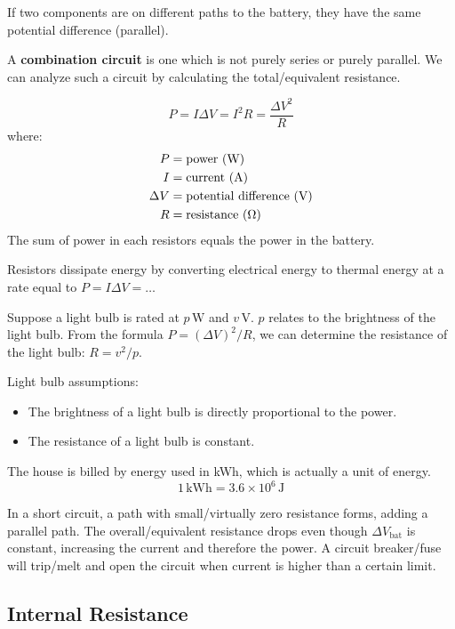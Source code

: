 \documentclass{article}
\newcommand{\definition}[1]{\begin{tcolorbox}[colback=red!5!white,colframe=red!75!black,parbox=false] #1 \end{tcolorbox}}
\newcommand{\defitheorem}[2]{\begin{tcolorbox}[title={#1},colback=violet!5!white,colframe=violet!75!black,parbox=false] #2 \end{tcolorbox}}
\newcommand{\remark}[2]{\begin{tcolorbox}[title={#1},colback=black!5!white,colframe=black!75!black,parbox=false] #2 \end{tcolorbox}}
\begin{document}
If two components are on different paths to the battery, they have the same potential difference (parallel).

\definition{A \textbf{combination circuit} is one which is not purely series or purely parallel. We can analyze such a circuit by calculating the total/equivalent resistance.}

\defitheorem{Power}{
	\begin{equation*}
	    P
		=I\Delta V
		=I^2R
		=\frac{\Delta V^2}{R}
	\end{equation*}
	where:
	\begin{align*}
		P&=\text{power (W)} \\
		I&=\text{current (A)} \\
		\Delta V&=\text{potential difference (V)} \\
		R&=\text{resistance (\si{\ohm})}
	\end{align*}
	The sum of power in each resistors equals the power in the battery.
}

Resistors dissipate energy by converting electrical energy to thermal energy at a rate equal to $P=I\Delta V=\ldots$

\remark{Light bulb ratings}{
	Suppose a light bulb is rated at $p\,\si{\watt}$ and $v\,\si{\volt}$. $p$ relates to the brightness of the light bulb. From the formula $P=(\Delta V)^2/R$, we can determine the resistance of the light bulb: $R=v^2/p$.

	Light bulb assumptions:
	\begin{itemize}
	    \item The brightness of a light bulb is directly proportional to the power.
		\item The resistance of a light bulb is constant.
	\end{itemize}
}

\remark{Electric bills}{
	The house is billed by energy used in kWh, which is actually a unit of energy.
	\begin{equation*}
		1\,\text{kWh}=3.6\times 10^6\,\si{\joule}
	\end{equation*}
}

In a short circuit, a path with small/virtually zero resistance forms, adding a parallel path. The overall/equivalent resistance drops even though $\Delta V_\text{bat}$ is constant, increasing the current and therefore the power. A circuit breaker/fuse will trip/melt and open the circuit when current is higher than a certain limit.

\subsection{Internal Resistance}
\end{document}
